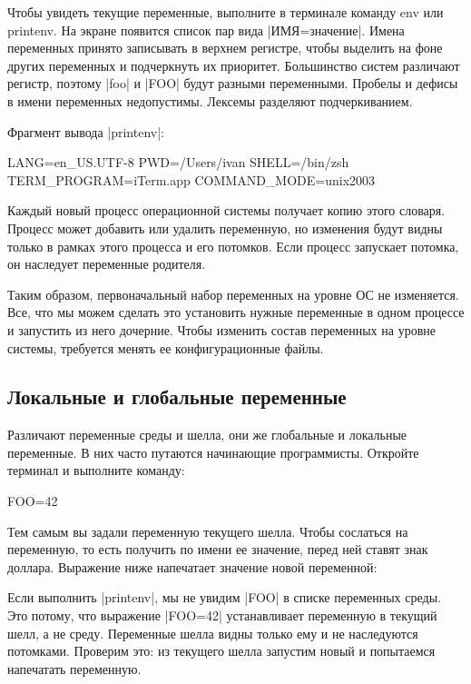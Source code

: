 Чтобы увидеть текущие переменные, выполните в терминале команду env или
printenv. На экране появится список пар вида \spverb|ИМЯ=значение|. Имена переменных
принято записывать в верхнем регистре, чтобы выделить на фоне других переменных
и подчеркнуть их приоритет. Большинство систем различают регистр, поэтому \spverb|foo|
и \spverb|FOO| будут разными переменными. Пробелы и дефисы в имени переменных
недопустимы. Лексемы разделяют подчеркиванием.

Фрагмент вывода \spverb|printenv|:

\begin{code}
LANG=en_US.UTF-8
PWD=/Users/ivan
SHELL=/bin/zsh
TERM_PROGRAM=iTerm.app
COMMAND_MODE=unix2003
\end{code}

Каждый новый процесс операционной системы получает копию этого словаря. Процесс
может добавить или удалить переменную, но изменения будут видны только в рамках
этого процесса и его потомков. Если процесс запускает потомка, он наследует
переменные родителя.

Таким образом, первоначальный набор переменных на уровне ОС не изменяется. Все,
что мы можем сделать это установить нужные переменные в одном процессе и
запустить из него дочерние. Чтобы изменить состав переменных на уровне системы,
требуется менять ее конфигурационные файлы.

\subsection{Локальные и глобальные переменные}

Различают переменные среды и шелла, они же глобальные и локальные переменные. В
них часто путаются начинающие программисты. Откройте терминал и выполните
команду:

\begin{code}
FOO=42
\end{code}

Тем самым вы задали переменную текущего шелла. Чтобы сослаться на переменную, то
есть получить по имени ее значение, перед ней ставят знак доллара. Выражение
ниже напечатает значение новой переменной:


Если выполнить \spverb|printenv|, мы не увидим \spverb|FOO| в списке переменных среды. Это
потому, что выражение \spverb|FOO=42| устанавливает переменную в текущий шелл, а не
среду. Переменные шелла видны только ему и не наследуются потомками. Проверим
это: из текущего шелла запустим новый и попытаемся напечатать переменную.

